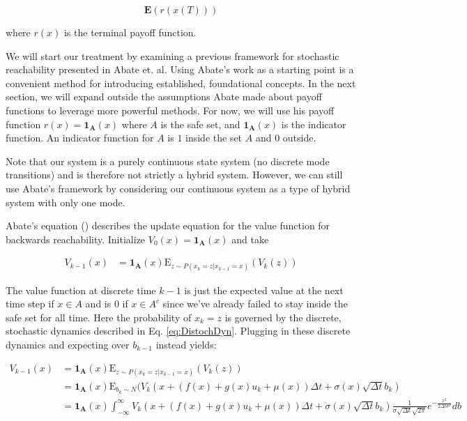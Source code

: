 \documentclass[a4paper]{article}
\begin{document}
$$
\mathbf{E}(r(x(T)))
$$

where $r(x)$ is the terminal payoff function.

We will start our treatment by examining a previous framework for stochastic reachability presented in Abate et. al. %
Using Abate's work as a starting point is a convenient method for introducing established, foundational concepts.
In the next section, we will expand outside the assumptions Abate made about payoff functions to leverage more powerful methods.
For now, we will use his payoff function $r(x) = \mathbf{1_A}(x)$ where $A$ is the safe set, and $\mathbf{1_A}(x)$ is the indicator function.
An indicator function for $A$ is $1$ inside the set $A$ and $0$ outside.

Note that our system is a purely continuous state system (no discrete mode transitions) and is therefore not strictly a hybrid system.
However, we can still use Abate's framework by considering our continuous system as a type of hybrid system with only one mode.

Abate's equation () describes the update equation for the value function for backwards reachability.
Initialize $V_0(x) = \mathbf{1_A}(x)$ and take

\begin{align}
V_{k-1}(x) & = \mathbf{1_A}(x) \mathrm{E}_{z \sim P(x_k = z | x_{k-1}=x)} (V_k(z))
\end{align}

The value function at discrete time $k-1$ is just the expected value at the next time step if $x \in A$ and is 0 if $x \in A^c$ since we've already failed to stay inside the safe set for all time.
Here the probability of $x_k = z$ is governed by the discrete, stochastic dynamics described in Eq. \ref{eq:DistochDyn}.
Plugging in these discrete dynamics and expecting over $b_{k-1}$ instead yields:

\begin{align}
V_{k-1}(x) & = \mathbf{1_A}(x) \mathrm{E}_{z \sim P(x_k = z | x_{k-1}=x)} (V_k(z))
\\ & = \mathbf{1_A}(x) \mathrm{E}_{b_k\sim N} (V_k( x + (f(x) + g(x) u_k + \mu(x)) \Delta t + \sigma(x) \sqrt{\Delta t} b_k )
\\ & = \mathbf{1_A}(x) \int_{-\infty}^{\infty} V_k( x + (f(x) + g(x) u_k + \mu(x)) \Delta t + \sigma(x) \sqrt{\Delta t} b_k )      \frac{1}{\sigma \sqrt{\Delta t} \sqrt{2 \pi}} e^{-\frac{x^2}{2 \Delta t \sigma^2}} db
\label{eq:AbateBrute}
\end{align}
\end{document}

